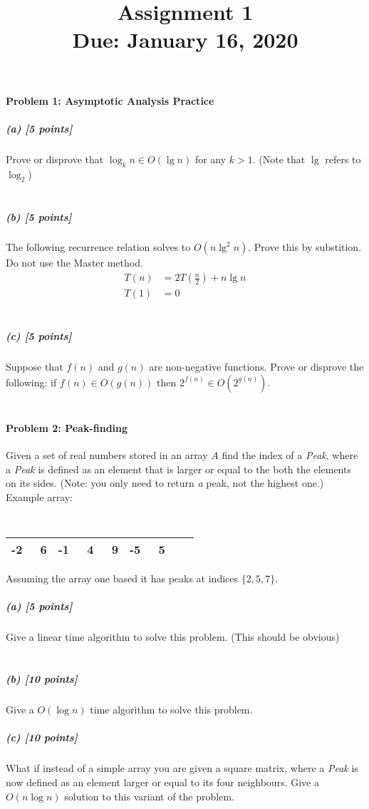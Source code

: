 \documentclass[11pt]{article}
\title{\bf Assignment 1 \\[2ex]
\rm\normalsize Due: January 16, 2020}
\date{}
\author{}
\begin{document}
\maketitle

\paragraph{Problem 1: Asymptotic Analysis Practice}
\subparagraph{(a) [5 points]}
Prove or disprove that $\log_k n \in O(\lg n)$ for any $k > 1$. (Note that $\lg$ refers to $\log_2$) \\

\\
\subparagraph{(b) [5 points]}
The following recurrence relation solves to $O(n \lg^2 n)$. Prove this by substition. Do not use the Master method.
\begin{align*}
T(n) &= 2T\left( \frac n2 \right) + n \lg n \\
T(1) &= 0
\end{align*}
\\

\subparagraph{(c) [5 points]}
Suppose that $f(n)$ and $g(n)$ are non-negative functions. Prove or disprove the following: if $f(n) \in O(g(n))$ then $2^{f(n)} \in O(2^{g(n)})$. \\
\\


\paragraph{Problem 2: Peak-finding}
Given a set of real numbers stored in an array $A$ find the index of a {\em Peak}, where a {\em Peak} is defined as an
element that is larger or equal to the both the elements on its sides. (Note: you only need to return {\em a} peak, not
the highest one.)\\

Example array:
                {\tt
                \begin{tabular}{|*{9}{r|}}
                    \hline
                    -2 & \ 6 & -1 & \ 4 & \ 9 & -5 & \ 5  \\
                    \hline
                \end{tabular}
                }

Assuming the array one based it has peaks at indices $\{2,5,7 \}$.

\subparagraph{(a) [5 points]}
Give a linear time algorithm to solve this problem. (This should be obvious) \\
\\


\subparagraph{(b) [10 points]}
Give a $O(\log n)$ time algorithm to solve this problem.
\\


\subparagraph{(c) [10 points]}
What if instead of a simple array you are given a square matrix, where a {\em Peak} is now defined as an element larger
or equal to its four neighbours. Give a $O(n \log n)$ solution to this variant of the problem.
\\

\end{document}
